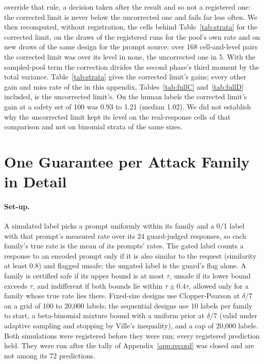 override that rule, a decision taken after the result and so not a registered one: the corrected limit is never below
the uncorrected one and fails far less often. We then recomputed, without registration, the cells behind Table~\ref{tab:strata} for the
corrected limit, on the draws of the registered runs for the pool's own rate and on new draws of the same design for the
prompt source: over 168 cell-and-level pairs the corrected limit was over its level in none, the
uncorrected one in 5. With the sampled-pool term the correction divides the second phase's third moment by the total
variance. Table~\ref{tab:strata} gives the corrected limit's gains; every other gain and miss rate of the \SWT{} in this
appendix, Tables~\ref{tab:fullC} and~\ref{tab:fullD} included, is the uncorrected limit's. On the human labels the
corrected limit's gain at a safety set of 100 was 0.93 to 1.21 (median 1.02). We did
not establish why the uncorrected limit kept its level on the real-response cells of that comparison and not on binomial
strata of the same sizes.

\section{One Guarantee per Attack Family in Detail}
\label{app:family}

\paragraph{Set-up.} A simulated label picks a prompt uniformly within its family and a 0/1 label with that prompt's
measured rate over its 24 guard-judged responses, so each family's true rate is the mean of its prompts' rates. The
gated label counts a response to an encoded prompt only if it is also similar to the request (similarity at least 0.8)
and flagged unsafe; the ungated label is the guard's flag alone. A family is certified safe if its upper bound is at most
$\tau$, unsafe if its lower bound exceeds $\tau$, and indifferent if both bounds lie within $\tau\pm0.4\tau$, allowed only
for a family whose true rate lies there. Fixed-size designs use Clopper-Pearson at $\delta/7$ on a grid of 100 to 20,000
labels; the sequential designs use 10 labels per family to start, a beta-binomial mixture bound with a uniform prior at
$\delta/7$ (valid under adaptive sampling and stopping by Ville's inequality), and a cap of 20,000 labels. Both
simulations were registered before they were run; every registered prediction held. They were run after the tally of
Appendix~\ref{app:record} was closed and are not among its 72 predictions.

